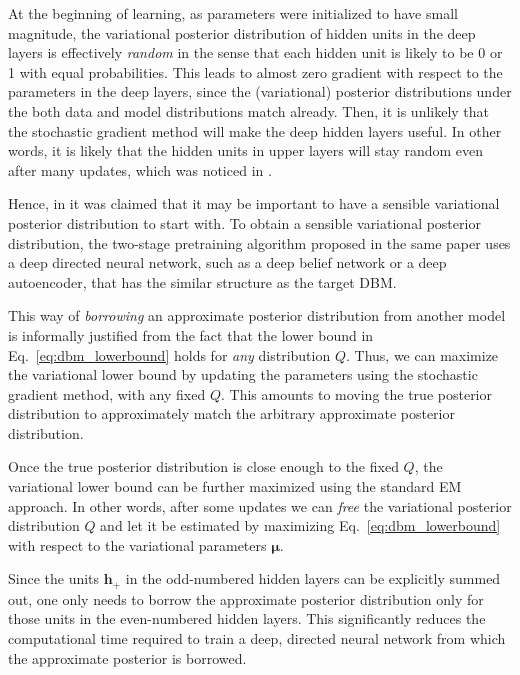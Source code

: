 \documentclass[dissertation,nocontribution,draft*]{aaltoseries}
\newcommand{\vect}[1]{\mathbf{#1}}
\newcommand{\vects}[1]{\boldsymbol{#1}}
\newcommand{\vh}[0]{\vect{h}}
\newcommand{\vmu}[0]{\vects{\mu}}
\begin{document}
At the beginning of learning, as parameters were initialized
to have small magnitude, the variational posterior
distribution of hidden units in the deep layers is
effectively \textit{random} in the sense that each hidden unit
is likely to be 0 or 1 with equal probabilities. This leads
to almost zero gradient with respect to the parameters in
the deep layers, since the (variational) posterior
distributions under the both data and model distributions
match already. Then, it is unlikely that the stochastic
gradient method will make the deep hidden layers useful. In
other words, it is likely that the hidden units in upper
layers will stay random even after many updates, which was
noticed in .

Hence, in  it was claimed that it may
be important to have a sensible variational posterior
distribution to start with. To obtain a sensible variational
posterior distribution, the two-stage pretraining algorithm
proposed in the same paper uses a deep directed
neural network, such as a deep belief network or a deep
autoencoder, that has the similar structure as the target
DBM.

This way of \textit{borrowing} an approximate posterior
distribution from another model is informally justified from
the fact that the lower bound in
Eq.~\eqref{eq:dbm_lowerbound} holds for \textit{any}
distribution $Q$. Thus, we can maximize the variational
lower bound by updating the parameters using the stochastic
gradient method, with any fixed $Q$. This amounts to moving
the true posterior distribution to approximately match the
arbitrary approximate posterior distribution.

Once the true posterior distribution is close enough to the
fixed $Q$, the variational lower bound can be further
maximized using the standard EM approach. In other words,
after some updates we can \textit{free} the variational
posterior distribution $Q$ and let it be estimated by
maximizing Eq.~\eqref{eq:dbm_lowerbound} with respect to the
variational parameters $\vmu$.

Since the units $\vh_+$
in the odd-numbered hidden layers can be explicitly summed
out, one only needs to borrow the approximate
posterior distribution only for those units in the
even-numbered hidden layers. This significantly reduces the
computational time required to train a deep, directed neural
network from which the approximate posterior is borrowed.
\end{document}
